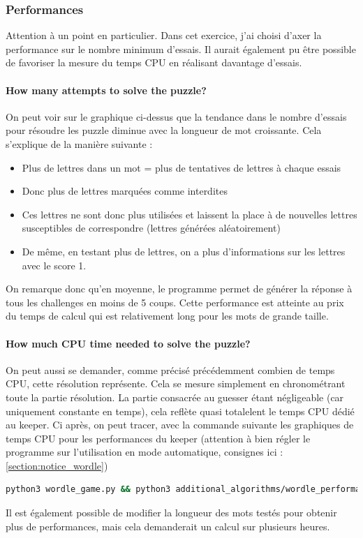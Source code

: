 \documentclass[10pt,a4paper,hidelinks]{article}
\begin{document}
\subsubsection{Performances}
Attention à un point en particulier. Dans cet exercice, j'ai choisi d'axer la performance sur le nombre minimum d'essais. Il aurait également pu être possible de favoriser la mesure du temps CPU en réalisant davantage d'essais.
\paragraph{How many attempts to solve the puzzle?}
On peut voir sur le graphique ci-dessus que la tendance dans le nombre d'essais pour résoudre les puzzle diminue avec la longueur de mot croissante. Cela s'explique de la manière suivante :
\begin{itemize}
    \item Plus de lettres dans un mot = plus de tentatives de lettres à chaque essais
    \item Donc plus de lettres marquées comme interdites
    \item Ces lettres ne sont donc plus utilisées et laissent la place à de nouvelles lettres susceptibles de correspondre (lettres générées aléatoirement)
    \item De même, en testant plus de lettres, on a plus d'informations sur les lettres avec le score 1.
\end{itemize}

On remarque donc qu'en moyenne, le programme permet de générer la réponse à tous les challenges en moins de 5 coups. Cette performance est atteinte au prix du temps de calcul qui est relativement long pour les mots de grande taille.

\paragraph{How much CPU time needed to solve the puzzle?}
On peut aussi se demander, comme précisé précédemment combien de temps CPU, cette résolution représente. Cela se mesure simplement en chronométrant toute la partie résolution. La partie consacrée au guesser étant négligeable (car uniquement constante en temps), cela reflète quasi totalelent le temps CPU dédié au keeper. Ci après, on peut tracer, avec la commande suivante les graphiques de temps CPU pour les performances du keeper (attention à bien régler le programme sur l'utilisation en mode automatique, consignes ici : \ref{section:notice_wordle})
\begin{lstlisting}[language=Bash]
python3 wordle_game.py && python3 additional_algorithms/wordle_performance.py
\end{lstlisting}
Il est également possible de modifier la longueur des mots testés pour obtenir plus de performances, mais cela demanderait un calcul sur plusieurs heures.

\end{document}
